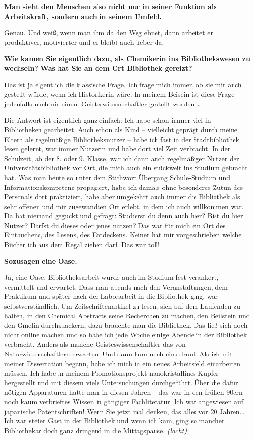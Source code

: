 \documentclass[a4paper,
fontsize=11pt,
oneside,
numbers=noperiodatend,
parskip=half-,
bibliography=totoc,
final
]{scrartcl}
\begin{document}
\newpage 

\textbf{Man sieht den Menschen also nicht nur in seiner Funktion als
Arbeitskraft, sondern auch in seinem Umfeld.}

Genau. Und weiß, wenn man ihm da den Weg ebnet, dann arbeitet er
produktiver, motivierter und er bleibt auch lieber da.

\textbf{Wie kamen Sie eigentlich dazu, als Chemikerin ins
Bibliothekswesen zu wechseln? Was hat Sie an dem Ort Bibliothek
gereizt?}

Das ist ja eigentlich die klassische Frage. Ich frage mich immer, ob sie
mir auch gestellt würde, wenn ich Historikerin wäre. In meinem Beisein
ist diese Frage jedenfalls noch nie einem Geisteswissenschaftler
gestellt worden \ldots{}

Die Antwort ist eigentlich ganz einfach: Ich habe schon immer viel in
Bibliotheken gearbeitet. Auch schon als Kind -- vielleicht geprägt durch
meine Eltern als regelmäßige Bibliotheksnutzer -- habe ich fast in der
Stadtbibliothek lesen gelernt, war immer Nutzerin und habe dort viel
Zeit verbracht. In der Schulzeit, ab der 8. oder 9. Klasse, war ich dann
auch regelmäßiger Nutzer der Universitätsbibliothek vor Ort, die mich
auch ein stückweit ins Studium gebracht hat. Was man heute so unter dem
Stichwort Übergang Schule-Studium und Informationskompetenz propagiert,
habe ich damals ohne besonderes Zutun des Personals dort praktiziert,
habe aber umgekehrt auch immer die Bibliothek als sehr offenen und mir
zugewandten Ort erlebt, in dem ich auch willkommen war. Da hat niemand
geguckt und gefragt: Studierst du denn auch hier? Bist du hier Nutzer?
Darfst du dieses oder jenes nutzen? Das war für mich ein Ort des
Eintauchens, des Lesens, des Entdeckens. Keiner hat mir vorgeschrieben
welche Bücher ich aus dem Regal ziehen darf. Das war toll!

\textbf{Sozusagen eine Oase.}

Ja, eine Oase. Bibliotheksarbeit wurde auch im Studium fest verankert,
vermittelt und erwartet. Dass man abends nach den Veranstaltungen, dem
Praktikum und später nach der Laborarbeit in die Bibliothek ging, war
selbstverständlich. Um Zeitschriftenartikel zu lesen, sich auf dem
Laufenden zu halten, in den Chemical Abstracts seine Recherchen zu
machen, den Beilstein und den Gmelin durchzuackern, dazu brauchte man
die Bibliothek. Das ließ sich noch nicht online machen und so habe ich
jede Woche einige Abende in der Bibliothek verbracht. Anders als manche
Geisteswissenschaftler das von Naturwissenschaftlern erwarten. Und dann
kam noch eins drauf. Als ich mit meiner Dissertation begann, habe ich
mich in ein neues Arbeitsfeld einarbeiten müssen. Ich habe in meinem
Promotionsprojekt nanokristallines Kupfer hergestellt und mit diesem
viele Untersuchungen durchgeführt. Über die dafür nötigen Apparaturen
hatte man in diesen Jahren -- das war in den frühen 90ern -- noch kaum
verbrieftes Wissen in gängiger Fachliteratur. Ich war angewiesen auf
japanische Patentschriften! Wenn Sie jetzt mal denken, das alles vor 20
Jahren\ldots{} Ich war steter Gast in der Bibliothek und wenn ich kam,
ging so mancher Bibliothekar doch ganz dringend in die Mittagspause.
\emph{(lacht)}
\end{document}
